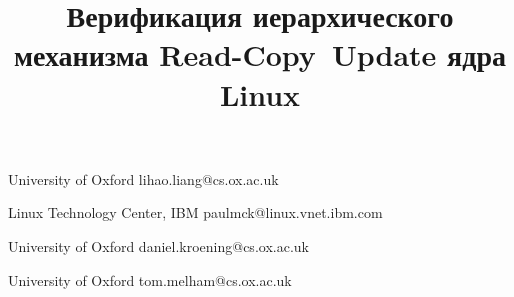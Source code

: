 \documentclass[preprint, 10pt, numbers]{sigplanconf}
\begin{document}
\title{Верификация иерархического механизма Read-Copy~Update ядра Linux}
\date{}


           {University of Oxford}
           {lihao.liang@cs.ox.ac.uk}

           {Linux Technology Center, IBM}
           {paulmck@linux.vnet.ibm.com}

           {University of Oxford}
           {daniel.kroening@cs.ox.ac.uk}

           {University of Oxford}
           {tom.melham@cs.ox.ac.uk}




\maketitle
\end{document}
